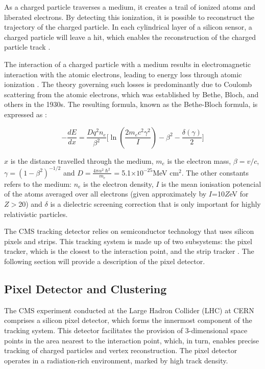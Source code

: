 As a charged particle traverses a medium, it creates a trail of ionized atoms and liberated electrons. By detecting this ionization, it is possible to reconstruct the trajectory of the charged particle. In each cylindrical layer of a silicon sensor, a charged particle will leave a hit, which enables the reconstruction of the charged particle track \cite{thomson_2013}.

The interaction of a charged particle with a medium results in electromagnetic interaction with the atomic electrons, leading to energy loss through atomic ionization \cite{thomson_2013}. The theory governing such losses is predominantly due to Coulomb scattering from the atomic electrons, which was established by Bethe, Bloch, and others in the 1930s. The resulting formula, known as the Bethe-Bloch formula, is expressed as \cite{Martin2017_book}:

\begin{equation}
  -\frac{dE}{dx}= \frac{Dq^{2}n_{e}}{\beta ^{2}} \biggl[ \ln \left(\frac{2m_{e}c^{2}\gamma^{2}}{I} \right) -\beta^{2} -\frac{\delta(\gamma)}{2}  \biggr]
  \label{bethe}
\end{equation}

$x$ is the distance travelled through the medium, $m_{e}$ is the electron mass, $\beta=v/c$,  $\gamma =(1-\beta^{2})^{-1/2}$ and $D=\frac{4\pi \alpha^{2} \hslash^{2}}{m_{e}}=$5.1$\times 10^{-25}$MeV cm$^{2}$. The other constants refers to the medium: $n_{e}$ is the electron density, $I$ is the mean ionisation potencial of the atoms averaged over all electrons (given approximately by $I$=10$Z$eV for $Z>$20) and $\delta$ is a dielectric screening correction that is only important for highly relativistic particles. 

The CMS tracking detector relies on semiconductor technology that uses silicon pixels and strips. This tracking system is made up of two subsystems: the pixel tracker, which is the closest to the interaction point, and the strip tracker \cite{CMS_Exp_2008}. The following section will provide a description of the pixel detector.

\subsection{Pixel Detector and Clustering}
\label{pixel_clust_reco}

The CMS experiment conducted at the Large Hadron Collider (LHC) at CERN comprises a silicon pixel detector, which forms the innermost component of the tracking system. This detector facilitates the provision of 3-dimensional space points in the area nearest to the interaction point, which, in turn, enables precise tracking of charged particles and vertex reconstruction. The pixel detector operates in a radiation-rich environment, marked by high track density.

